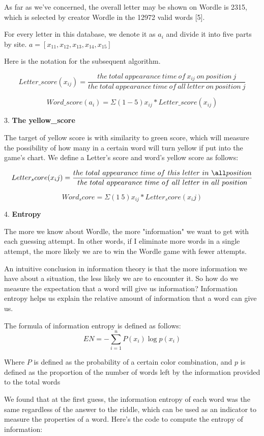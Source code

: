\documentclass{mcmthesis}
\begin{document}
As far as we've concerned, the overall letter may be shown on Wordle is 2315, which is selected by creator Wordle in the 12972 valid words [5]. 

For every letter in this database, we denote it as $a_{i}$ and divide it into five parts by site. $a = [x_{11},x_{12},x_{13},x_{14},x_{15}]$

Here is the notation for the subsequent algorithm.

\[Letter\_score(x_{ij})=\frac{the\ total\ appearance\ time\ of\ x_{ij}\ on\ position\ j}{ the\ total\ appearance\ time\ of\ all\ letter\ on\ position\ j } \]

\[ Word\_score(a_i)=Σ(1-5) x_{ij}* Letter\_score(x_{ij}) \]


3. \textbf{The yellow\_score}

The target of yellow score is with similarity to green score, which will measure the possibility of how many in a certain word will turn yellow if put into the game’s chart.
 We define a Letter’s score and word’s yellow score as follows:

\[Letter_score(x_ij) = \frac{the\ total\ appearance\ time\ of\ this\ letter\ in\ \all position}{the\ total\ appearance\ time\ of\ all\ letter\ in\ all\ position }
\]

\[ Word_score = Σ(1~5) {x_{ij}* Letter_score(x_ij)} \]
 
4. \textbf{Entropy}

The more we know about Wordle, the more "information" we want to get with each guessing attempt. In other words, if I eliminate more words in a single attempt, the more likely we are to win the Wordle game with fewer attempts.

An intuitive conclusion in information theory is that the more information we have about a situation, the less likely we are to encounter it. So how do we measure the expectation that a word will give us information? Information entropy helps us explain the relative amount of information that a word can give us.

The formula of information entropy is defined as follows:
\[ EN=-\sum_{i=1}^n P\left(x_i\right) \log p\left(x_i\right)\]

Where $P$ is defined as the probability of a certain color combination, and $p$ is defined as the proportion of the number of words left by the information provided to the total words

We found that at the first guess, the information entropy of each word was the same regardless of the answer to the riddle, which can be used as an indicator to measure the properties of a word. Here's the code to compute the entropy of information:
\end{document}
